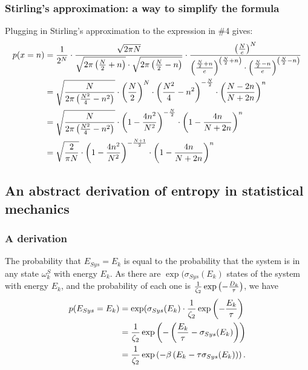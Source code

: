 \documentclass{paper}
\begin{document}
\subsubsection{Stirling's approximation: a way to simplify the formula}

\par Plugging in Stirling's approximation to the expression in \#4 gives:
    \begin{align*}
        p(x=n) &= \frac{1}{2^N} \cdot \frac{\sqrt{2\pi N}}{\sqrt{2\pi \left(\frac{N}{2} + n\right)} \cdot \sqrt{2\pi \left(\frac{N}{2} - n\right)}} \cdot \frac{\left(\frac{N}{e}\right)^N}{\left(\frac{\frac{N}{2} + n}{e}\right)^{\left(\frac{N}{2} + n\right)} \cdot \left(\frac{\frac{N}{2} - n}{e}\right)^{\left(\frac{N}{2} - n\right)}}\\
        &= \sqrt{\frac{N}{2\pi \left(\frac{N^2}{4} - n^2\right)}} \cdot \left(\frac{N}{2}\right)^N \cdot \left(\frac{N^2}{4} - n^2\right)^{-\frac{N}{2}} \cdot \left(\frac{N-2n}{N+2n}\right)^n \\
        &= \sqrt{\frac{N}{2\pi \left(\frac{N^2}{4} - n^2\right)}} \cdot \left(1 - \frac{4n^2}{N^2}\right)^{-\frac{N}{2}} \cdot \left(1 - \frac{4n}{N+2n}\right)^n \\
        &= \sqrt{\frac{2}{\pi N}} \cdot \left(1 - \frac{4n^2}{N^2}\right)^{-\frac{N+1}{2}} \cdot \left(1 - \frac{4n}{N+2n}\right)^n
    \end{align*}

\subsection{An abstract derivation of entropy in statistical mechanics}
\subsubsection{A derivation}

\par The probability that $E_{Sys} = E_k$ is equal to the probability that the system is in any state $\omega^S_k$ with energy $E_k$.  As there are $\exp(\sigma_{Sys}(E_k)$ states of the system with energy $E_k$, and the probability of each one is $\frac{1}{\zeta_2}\exp\left(-\frac{D_k}{\tau}\right)$, we have
    \begin{align*}
        p(E_{Sys} = E_k) &= \exp(\sigma_{Sys}(E_k) \cdot \frac{1}{\zeta_2} \exp \left( - \frac{E_k}{\tau} \right) \\
        &= \frac{1}{\zeta_2} \exp \left( - \left( \frac{E_k}{\tau} - \sigma_{Sys}(E_k) \right) \right) \\
        &= \frac{1}{\zeta_2} \exp \left( -\beta \left( E_k - \tau \sigma_{Sys}(E_k) \right) \right).
    \end{align*}
    
\end{document}
